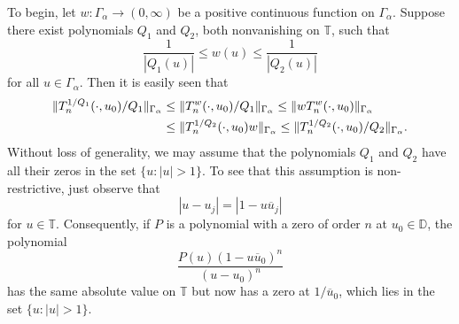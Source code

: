 \documentclass[12pt,oneside,reqno]{amsart}
\theoremstyle{definition}
\numberwithin{equation}{section}
\newcommand{\D}{{\mathbb D}}
\newcommand{\T}{{\mathbb T}}
\begin{document}
To begin, let $w:\Gamma_\alpha\rightarrow (0,\infty)$ be a positive continuous function on $\Gamma_\alpha$. Suppose there exist polynomials $Q_1$ and $Q_2$, both nonvanishing on $\T$, such that
\begin{equation}
	\frac{1}{|Q_1(u)|}\leq w(u)\leq \frac{1}{|Q_2(u)|}
	\label{eq:polynomial_weight_inequalities}
\end{equation}
for all $u\in \Gamma_\alpha$. Then it is easily seen that
\begin{align} \notag
	\|T_n^{1/Q_1}(\cdot,u_0)/Q_1\|_{\Gamma_\alpha}&\leq \|T_n^{w}(\cdot,u_0)/Q_1\|_{\Gamma_\alpha}\leq \|w T_n^{w}(\cdot,u_0)\|_{\Gamma_\alpha}\\&\leq\|T_n^{1/Q_2}(\cdot,u_0)w\|_{\Gamma_\alpha}\leq \|T_n^{1/Q_2}(\cdot,u_0)/Q_2\|_{\Gamma_\alpha}.	
\end{align}
Without loss of generality, we may assume that the polynomials $Q_1$ and $Q_2$ have all their zeros in the set $\{u: |u|> 1\}$. To see that this assumption is non-restrictive, just observe that
\[
   |u-u_j| = |1-u\overline{u}_j| 
\]
for $u\in \T$. Consequently, if $P$ is a polynomial with a zero of order $n$ at $u_0\in \D$, the polynomial 
\[
   \frac{P(u)(1-u\overline{u}_0)^n}{(u-u_0)^n}
\] 
has the same absolute value on $\T$ but now has a zero at $1/\overline{u}_0$, which lies in the set $\{u: |u|>1\}$. 
\end{document}
